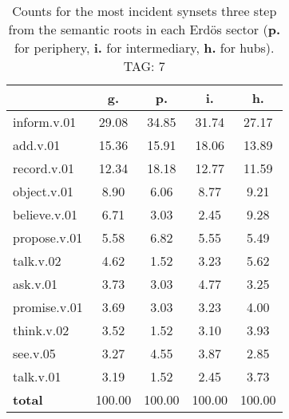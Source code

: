 \begin{table}[h!]
\begin{center}
\begin{tabular}{| l | c | c | c | c |}\hline
 & g. & p. & i. & h. \\\hline
inform.v.01 & 29.08  & 34.85  & 31.74  & 27.17 \\\hline
add.v.01 & 15.36  & 15.91  & 18.06  & 13.89 \\\hline
record.v.01 & 12.34  & 18.18  & 12.77  & 11.59 \\\hline
object.v.01 & 8.90  & 6.06  & 8.77  & 9.21 \\\hline
believe.v.01 & 6.71  & 3.03  & 2.45  & 9.28 \\\hline
propose.v.01 & 5.58  & 6.82  & 5.55  & 5.49 \\\hline
talk.v.02 & 4.62  & 1.52  & 3.23  & 5.62 \\\hline
ask.v.01 & 3.73  & 3.03  & 4.77  & 3.25 \\\hline
promise.v.01 & 3.69  & 3.03  & 3.23  & 4.00 \\\hline
think.v.02 & 3.52  & 1.52  & 3.10  & 3.93 \\\hline
see.v.05 & 3.27  & 4.55  & 3.87  & 2.85 \\\hline
talk.v.01 & 3.19  & 1.52  & 2.45  & 3.73 \\\hline
{{\bf total}} & 100.00  & 100.00  & 100.00  & 100.00 \\\hline
\end{tabular}
\caption{Counts for the most incident synsets three step from the semantic roots in each Erd\"os sector ({\bf p.} for periphery, {\bf i.} for intermediary, {\bf h.} for hubs). TAG: 7}
\end{center}
\end{table}